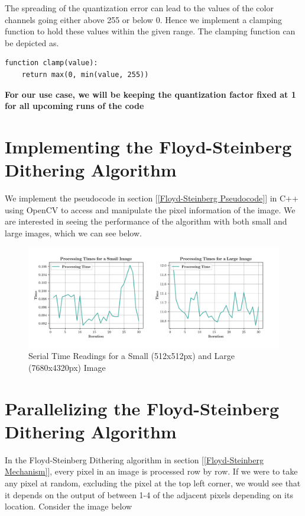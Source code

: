 \documentclass{article}
\begin{document}
\noindent The spreading of the quantization error can lead to the values of the color channels going either above 255 or below 0. Hence we implement a clamping function to hold these values within the given range. The clamping function can be depicted as.

\begin{verbatim}
function clamp(value):
    return max(0, min(value, 255))
\end{verbatim}

\noindent \textbf{For our use case, we will be keeping the quantization factor fixed at 1 for all upcoming runs of the code}

\section{Implementing the Floyd-Steinberg Dithering Algorithm}\label{Implementing Floyd-Steinberg Dithering}

We implement the pseudocode in section [\ref{Floyd-Steinberg Pseudocode}] in C++ using OpenCV to access and manipulate the pixel information of the image. We are interested in seeing the performance of the algorithm with both small and large images, which we can see below.

\begin{figure}[h]
    \centering
    \includegraphics[width=\textwidth]{graphs/serial_time_readings.png}
    \caption{Serial Time Readings for a Small (512x512px) and Large (7680x4320px) Image}
    \label{fig:serial_readings}
\end{figure}

\section{Parallelizing the Floyd-Steinberg Dithering Algorithm}

\medskip
\noindent In the Floyd-Steinberg Dithering algorithm in section [\ref{Floyd-Steinberg Mechanism}], every pixel in an image is processed row by row. If we were to take any pixel at random, excluding the pixel at the top left corner, we would see that it depends on the output of between 1-4 of the adjacent pixels depending on its location. Consider the image below\cite{Hartley}
\end{document}
